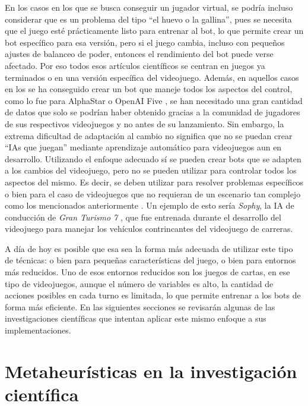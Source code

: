 En los casos en los que se busca conseguir un jugador virtual, se podría incluso considerar que es un problema del tipo ``el huevo o la gallina'', pues se necesita que el juego esté prácticamente listo para entrenar al bot, lo que permite crear un bot específico para esa versión, pero si el juego cambia, incluso con pequeños ajustes de balanceo de poder, entonces el rendimiento del bot puede verse afectado. Por eso todos esos artículos científicos se centran en juegos ya terminados o en una versión específica del videojuego. Además, en aquellos casos en los se ha conseguido crear un bot que maneje todos los aspectos del control, como lo fue para AlphaStar \cite{vinyals_grandmaster_2019} o OpenAI Five \cite{openai_dota_2019}, se han necesitado una gran cantidad de datos que solo se podrían haber obtenido gracias a la comunidad de jugadores de sus respectivos videojuegos y no antes de su lanzamiento. Sin embargo, la extrema dificultad de adaptación al cambio no significa que no se puedan crear ``IAs que juegan'' mediante aprendizaje automático para videojuegos aun en desarrollo. Utilizando el enfoque adecuado sí se pueden crear bots que se adapten a los cambios del videojuego, pero no se pueden utilizar para controlar todos los aspectos del mismo. Es decir, se deben utilizar para resolver problemas específicos o bien para el caso de videojuegos que no requieran de un escenario tan complejo como los mencionados anteriormente \cite{ai_and_games_why_2024}. Un ejemplo de esto sería \textit{Sophy}, la IA de conducción de \textit{Gran Turismo 7} \cite{wurman_outracing_2022}, que fue entrenada durante el desarrollo del videojuego para manejar los vehículos contrincantes del videojuego de carreras.

A día de hoy es posible que esa sea la forma más adecuada de utilizar este tipo de técnicas: o bien para pequeñas características del juego, o bien para entornos más reducidos. Uno de esos entornos reducidos son los juegos de cartas, en ese tipo de videojuegos, aunque el número de variables es alto, la cantidad de acciones posibles en cada turno es limitada, lo que permite entrenar a los bots de forma más eficiente. En las siguientes secciones se revisarán algunas de las investigaciones científicas que intentan aplicar este mismo enfoque a sus implementaciones.

\section{Metaheurísticas en la investigación científica} \label{sec:estado_arte}

